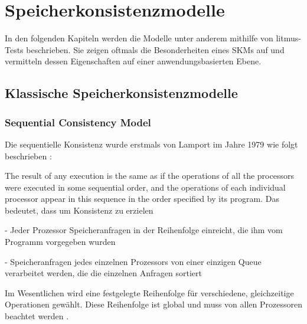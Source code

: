 \documentclass[final,bibliography=totocnumbered]{include/sikseminar}
\begin{document}










\section{Speicherkonsistenzmodelle}
In den folgenden Kapiteln werden die Modelle unter anderem mithilfe von litmus-Tests beschrieben.
Sie zeigen oftmals die Besonderheiten eines SKMs auf und vermitteln dessen Eigenschaften auf einer anwendungsbasierten Ebene.

	\subsection{Klassische Speicherkonsistenzmodelle}
	\subsubsection{Sequential Consistency Model}

Die sequentielle Konsistenz wurde erstmals von Lamport im Jahre 1979 wie folgt beschrieben \cite{lamp}: 

\glqq The result of any execution is the same as if the operations of all the processors were executed in some sequential order, and the operations of each individual processor appear in this sequence in the order specified by its program.\grqq
Das bedeutet, dass um Konsistenz zu erzielen

- Jeder Prozessor Speicheranfragen in der Reihenfolge einreicht, die ihm vom Programm vorgegeben wurden

- Speicheranfragen jedes einzelnen Prozessors von einer einzigen Queue verarbeitet werden, die die einzelnen Anfragen sortiert

Im Wesentlichen wird eine festgelegte Reihenfolge für verschiedene, gleichzeitige Operationen gewählt. Diese Reihenfolge ist global und muss von allen Prozessoren beachtet werden \cite{smcmtutorial,unified}.
\end{document}
